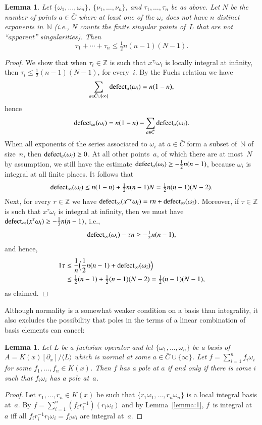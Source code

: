 \documentclass[final,1p,times,authoryear]{elsarticle}
\newtheorem{lemma}[theorem]{Lemma}
\def\<#1>{\langle#1\rangle}
\let\set\mathbb
\begin{document}
\begin{lemma}\label{lemma:bound-exps}
  Let $\{\omega_1,\dots,\omega_n\}$, $\{\nu_1,\dots,\nu_n\}$, and $\tau_1,\dots,\tau_n$ be as above.
  Let $N$ be the number of points $a\in\bar C$ where at least one of the $\omega_i$ does not have
  $n$ distinct exponents in~$\set N$ (i.e., $N$ counts the
  finite singular points of~$L$ that are not ``apparent'' singularities).
  Then
  \[
    \tau_1+\cdots+\tau_n \leq \tfrac12 n(n-1)(N-1).
  \]
\end{lemma}
\begin{proof}
  We show that when $\tau_i\in\set Z$ is such that $x^{\tau_i}\omega_i$ is locally integral at infinity,
  then $\tau_i\leq \frac12 (n-1)(N-1)$, for every~$i$.
  By the Fuchs relation we have
  \[
    \sum_{a\in\bar C\cup\{\infty\}}\operatorname{defect}_a(\omega_i) = n(1-n),
  \]
  hence
  \[
    \operatorname{defect}_\infty(\omega_i) = n(1-n) - \sum_{a\in\bar C}\operatorname{defect}_a(\omega_i).
  \]
  When all exponents of the series associated to $\omega_i$ at $a\in\bar C$ form a subset of~$\set N$ of size~$n$, then
  $\operatorname{defect}_a(\omega_i)\geq0$. At all other points~$a$, of which there are at most~$N$ by assumption,
  we still have the estimate $\operatorname{defect}_a(\omega_i)\geq-\frac12n(n-1)$, because $\omega_i$ is integral at all finite places.
  It follows that
  \[
    \operatorname{defect}_\infty(\omega_i)\leq n(1-n) + \tfrac12 n(n-1) N = \tfrac12 n(n-1)(N-2).
  \]
  Next, for every $r\in\set Z$ we have $\operatorname{defect}_\infty(x^{-r}\omega_i) = rn+\operatorname{defect}_\infty(\omega_i)$.
  Moreover, if $\tau\in\set Z$ is such that $x^{\tau}\omega_i$ is integral at infinity, then we must have
  $\operatorname{defect}_\infty(x^{\tau}\omega_i)\geq -\frac12n(n-1)$, i.e.,
  \[
    \operatorname{defect}_\infty(\omega_i) - \tau n \geq -\tfrac12n(n-1),
  \]
  and hence,
  \begin{alignat*}1
    \tau &\leq \frac1n\Bigl( \frac12n(n-1) + \defect_\infty(\omega_i) \Bigr) \\
      &\leq \tfrac12 (n-1) + \tfrac12 (n-1)(N-2) = \tfrac12 (n-1)(N-1),
  \end{alignat*}
  as claimed.
\end{proof}

Although normality is a somewhat weaker condition on a basis than integrality,
it also excludes the possibility that poles in the terms of a linear combination
of basis elements can cancel:

\begin{lemma}\label{lemma:3}
  Let $L$ be a fuchsian operator and let $\{\omega_1,\dots,\omega_n\}$ be a basis of $A=K(x)[\partial_x]/\<L>$
  which is normal at some $a\in\bar C\cup\{\infty\}$.
  Let $f=\sum_{i=1}^n f_i\omega_i$ for some $f_1,\dots,f_n\in K(x)$.
  Then $f$ has a pole at $a$ if and only if
  there is some $i$ such that $f_i\omega_i$ has a pole at~$a$.
\end{lemma}
\begin{proof}
  Let $r_1,\dots,r_n\in K(x)$ be such that $\{r_1\omega_1,\dots,r_n\omega_n\}$ is a
  local integral basis at~$a$. By $f=\sum_{i=1}^n
  (f_ir_i^{-1})(r_i\omega_i)$ and by Lemma~\ref{lemma:1}, $f$~is integral at~$a$ iff all
  $f_ir_i^{-1}r_i\omega_i=f_i\omega_i$ are integral at~$a$.
\end{proof}
\end{document}
